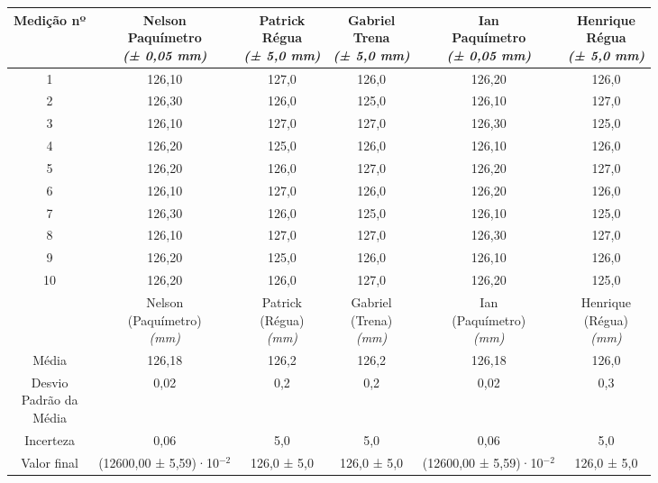 \documentclass{article}
\begin{document}
\begin{table}[h!]
\centering
\begin{tabular}{c c c c c c }
\toprule
Medição nº & \shortstack{Nelson\\Paquímetro\\\textit{(± 0,05 mm)}} & \shortstack{Patrick\\Régua\\\textit{(± 5,0 mm)}} & \shortstack{Gabriel\\Trena\\\textit{(± 5,0 mm)}} & \shortstack{Ian\\Paquímetro\\\textit{(± 0,05 mm)}} & \shortstack{Henrique\\Régua\\\textit{(± 5,0 mm)}}\\
\midrule
1 & 126,10 & 127,0 & 126,0 & 126,20 & 126,0\\
2 & 126,30 & 126,0 & 125,0 & 126,10 & 127,0\\
3 & 126,10 & 127,0 & 127,0 & 126,30 & 125,0\\
4 & 126,20 & 125,0 & 126,0 & 126,10 & 126,0\\
5 & 126,20 & 126,0 & 127,0 & 126,20 & 127,0\\
6 & 126,10 & 127,0 & 126,0 & 126,20 & 126,0\\
7 & 126,30 & 126,0 & 125,0 & 126,10 & 125,0\\
8 & 126,10 & 127,0 & 127,0 & 126,30 & 127,0\\
9 & 126,20 & 125,0 & 126,0 & 126,10 & 126,0\\
10 & 126,20 & 126,0 & 127,0 & 126,20 & 125,0\\
\midrule
&\shortstack{Nelson\\(Paquímetro)\\\textit{(mm)}} & \shortstack{Patrick\\(Régua)\\\textit{(mm)}} & \shortstack{Gabriel\\(Trena)\\\textit{(mm)}} & \shortstack{Ian\\(Paquímetro)\\\textit{(mm)}} & \shortstack{Henrique\\(Régua)\\\textit{(mm)}}\\
\midrule
Média & 126,18 & 126,2 & 126,2 & 126,18 & 126,0\\[3pt]
\shortstack{Desvio\\Padrão da\\Média} & 0,02 & 0,2 & 0,2 & 0,02 & 0,3\\[3pt]
Incerteza & 0,06 & 5,0 & 5,0 & 0,06 & 5,0\\[3pt]
Valor final & (12600,00 ± 5,59)·10$^{-2}$ & 126,0 ± 5,0 & 126,0 ± 5,0 & (12600,00 ± 5,59)·10$^{-2}$ & 126,0 ± 5,0\\[3pt]
\bottomrule
\end{tabular}
\end{table}
\end{document}
